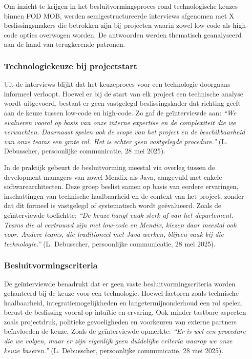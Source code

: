 Om inzicht te krijgen in het besluitvormingsproces rond technologische keuzes binnen \gls{FOD MOB}, werden semigestructureerde interviews afgenomen met X beslissingsmakers die betrokken zijn bij projecten waarin zowel low-code als high-code opties overwogen worden. De antwoorden werden thematisch geanalyseerd aan de hand van terugkerende patronen.

\subsubsection{Technologiekeuze bij projectstart}

Uit de interviews blijkt dat het keuzeproces voor een technologie doorgaans informeel verloopt. Hoewel er bij de start van elk project een technische analyse wordt uitgevoerd, bestaat er geen vastgelegd beslissingskader dat richting geeft aan de keuze tussen low-code en high-code. Zo gaf de geïnterviewde aan: \textit{“We evalueren vooral op basis van onze interne expertise en de complexiteit die we verwachten. Daarnaast spelen ook de scope van het project en de beschikbaarheid van onze teams een grote rol. Het is echter geen vastgelegde procedure.”} (L. Debusscher, persoonlijke communicatie, 28 mei 2025).

In de praktijk gebeurt de besluitvorming meestal via overleg tussen de development managers van zowel Mendix als Java, aangevuld met enkele softwarearchitecten. Deze groep beslist samen op basis van eerdere ervaringen, inschattingen van technische haalbaarheid en de context van het project, zonder dat dit formeel is vastgelegd of systematisch wordt geëvalueerd. Zoals de geïnterviewde toelichtte: \textit{“De keuze hangt vaak sterk af van het departement. Teams die al vertrouwd zijn met low-code en Mendix, kiezen daar meestal ook voor. Andere teams, die traditioneel met Java werken, blijven vaak bij die technologie.”} (L. Debusscher, persoonlijke communicatie, 28 mei 2025).

\subsubsection{Besluitvormingscriteria}

De geïnterviewde benadrukt dat er geen vaste besluitvormingscriteria worden gehanteerd bij de keuze voor een technologie. Hoewel factoren zoals technische haalbaarheid, integratiemogelijkheden en langetermijnonderhoud een rol spelen, berust de beslissing vooral op intuïtie en ervaring. Ook minder tastbare aspecten zoals projectdruk, politieke gevoeligheden en voorkeuren van externe partners beïnvloeden de keuze. Zoals de geïnterviewde opmerkte: \textit{“Er is wel een procedure die we volgen, maar er zijn eigenlijk geen duidelijke criteria waarop we onze keuze baseren.”} (L. Debusscher, persoonlijke communicatie, 28 mei 2025).

